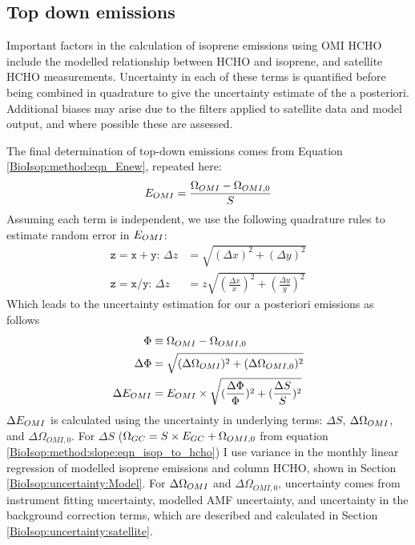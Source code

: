     
    
  \subsection{Top down emissions}
    \label{BioIsop:uncertainty:eomi}
    
    Important factors in the calculation of isoprene emissions using OMI HCHO include the modelled relationship between HCHO and isoprene, and satellite HCHO measurements.
    Uncertainty in each of these terms is quantified before being combined in quadrature to give the uncertainty estimate of the a posteriori.
    Additional biases may arise due to the filters applied to satellite data and model output, and where possible these are assessed. 
    
    The final determination of top-down emissions comes from Equation \ref{BioIsop:method:eqn_Enew}, repeated here: 
    \begin{equation*}
      E_{OMI}=\frac{\Omega_{OMI} - \Omega_{OMI,0}}{S}
    \end{equation*}
    Assuming each term is independent, we use the following quadrature rules to estimate random error in $E_{OMI}$:
    \begin{align}
      \mathtt{z=x+y:} \, \Delta{z} & = \sqrt{(\Delta{x})^2 + (\Delta{y})^2} \label{BioIsop:uncertainty:eqn_quadrature_add} \\
      \mathtt{z=x/y:} \, \Delta{z} & = z \sqrt{(\frac{\Delta{x}}{x})^2 + (\frac{\Delta{y}}{y})^2} \label{BioIsop:uncertainty:eqn_quadrature_divide} 
    \end{align}
    Which leads to the uncertainty estimation for our a posteriori emissions as follows
    \begin{align}
      \Phi & \equiv \Omega_{OMI} - \Omega_{OMI,0}   \notag \\
      \Delta{\Phi} & = \sqrt{(\Delta{\Omega_{OMI}})^2 + (\Delta{\Omega_{OMI,0}})^2}  \label{BioIsop:uncertainty:eomi:eqn_delta_Phi} \\
      \Delta{E_{OMI}} &= E_{OMI} \times \sqrt{(\frac{\Delta{\Phi}}{\Phi})^2 + (\frac{\Delta{S}}{S})^2} \label{BioIsop:uncertainty:eomi:eqn_delta_apost}
    \end{align}
    $\Delta{E_{OMI}}$ is calculated using the uncertainty in underlying terms: $\Delta{S}$, $\Delta{\Omega_{OMI}}$, and $\Delta{\Omega_{OMI,0}}$. 
    For $\Delta{S}$ ($\Omega_{GC} = S \times E_{GC} + \Omega_{OMI,0}$ from equation \ref{BioIsop:method:slope:eqn_isop_to_hcho}) I use variance in the monthly linear regression of modelled isoprene emissions and column HCHO, shown in Section \ref{BioIsop:uncertainty:Model}.
    For $\Delta \Omega_{OMI}$ and $\Delta \Omega_{OMI,0}$, uncertainty comes from instrument fitting uncertainty, modelled AMF uncertainty, and uncertainty in the background correction terms, which are described and calculated in Section \ref{BioIsop:uncertainty:satellite}.
    
